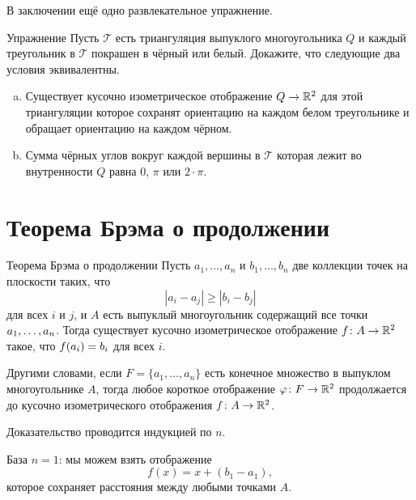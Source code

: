 В заключении ещё одно развлекательное упражнение.

\begin{thm}{Упражнение}\label{ex:black-and-white}
Пусть $\mathcal{T}$ есть триангуляция выпуклого многоугольника $Q$
и каждый треугольник в $\mathcal{T}$ покрашен в чёрный или белый.
Докажите, что следующие два условия эквивалентны.
\begin{enumerate}[a)]
\item Существует кусочно изометрическое отображение
$Q\to\mathbb{R}^2$ для этой триангуляции которое сохранят ориентацию
на каждом белом треугольнике и обращает ориентацию на каждом чёрном.

\item Сумма чёрных углов вокруг каждой вершины в $\mathcal{T}$ 
которая лежит во внутренности $Q$
равна $0$, $\pi$ или $2\cdot\pi$.
\end{enumerate}

\end{thm}

\section{Теорема Брэма о продолжении}


\begin{thm}{Теорема Брэма о продолжении}\label{thm:brehm}
Пусть $a_1,\dots,a_n$ и $b_1,\dots,b_n$ 
две коллекции точек на плоскости таких, что 
$$|a_i-a_j|\ge |b_i-b_j|$$
для всех $i$ и $j$,
и $A$ есть выпуклый многоугольник содержащий все точки $a_1,\z\dots,a_n$.
Тогда существует кусочно изометрическое отображение  $f\:A\z\to \RR^2$
такое, что
$f(a_i)\z=b_i$ для всех $i$.
\end{thm}

Другими словами, 
если $F=\{a_1,\dots,a_n\}$ есть конечное множество в выпуклом многоугольнике $A$, 
тогда любое короткое отображение $\varphi\colon F \to \mathbb{R}^2$ 
продолжается до кусочно изометрического отображения $f\colon A \to \mathbb{R}^2$.

Доказательство проводится индукцией по $n$.

База $n=1$:
мы можем взять отображение
$$f(x) = x + (b_1 - a_1),$$ 
которое сохраняет расстояния между любыми точками $A$.

